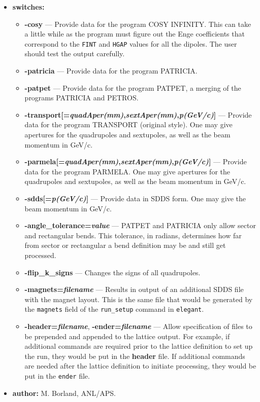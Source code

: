 \documentclass[11pt]{article}
\begin{document}
\begin{itemize}
\item {\bf switches:}
\begin{itemize}
\item {\bf -cosy} --- Provide data for the program COSY INFINITY.  This can take a little while
  as the program must figure out the Enge coefficients that correspond to the {\tt FINT} and
  {\tt HGAP} values for all the dipoles.  The user should test the output carefully.
\item {\bf -patricia} --- Provide data for the program PATRICIA.
\item {\bf -patpet} --- Provide data for the program PATPET, a merging of the programs
        PATRICIA and PETROS.
\item {\bf -transport[={\em quadAper(mm)},{\em sextAper(mm)},{\em p(GeV/c)}]} --- 
        Provide data for the program TRANSPORT (original style). 
	One may give apertures for
        the quadrupoles and sextupoles, as well as the beam momentum in GeV/c.
\item {\bf -parmela[={\em quadAper(mm)},{\em sextAper(mm)},{\em p(GeV/c)}]} --- 
        Provide data for the program PARMELA. One may give apertures for
        the quadrupoles and sextupoles, as well as the beam momentum in GeV/c.
\item {\bf -sdds[={\em p(GeV/c)}]} --- Provide data in SDDS form.  One may give the beam momentum in GeV/c.
\item {\bf -angle\_tolerance={\em value}}  --- PATPET and PATRICIA only allow sector and rectangular bends.
        This tolerance, in radians, determines how far from sector or rectangular a bend 
        definition may be and still get processed.
\item {\bf -flip\_k\_signs} --- Changes the signs of all quadrupoles.
\item {\bf -magnets={\em filename}} --- Results in output of an additional SDDS file with the magnet layout.
        This is the same file that would be generated by the {\tt magnets} field of the 
        {\tt run\_setup} command in {\tt elegant}.
\item {\bf -header={\em filename}}, {\bf -ender={\em filename}} --- 
        Allow specification of files to be prepended and appended to
        the lattice output.  For example, if additional commands are required prior to the
        lattice definition to set up the run, they would be put in the {\bf header} file.
        If additional commands are needed after the lattice definition to initiate processing, they 
        would be put in the {\tt ender} file.
\end{itemize}

\item {\bf author:} M. Borland, ANL/APS.
\end{itemize}
\end{document}
